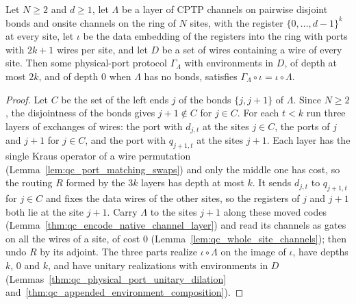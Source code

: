 \begin{lemma}
    \label{thm:qc_native_port_layer}
    \leanok
    Let $N\ge2$ and $d\ge1$, let $\Lambda$ be a layer of CPTP channels on pairwise disjoint bonds
    and onsite channels on the ring of $N$ sites, with the register $\{0,\dots,d-1\}^k$ at every
    site, let $\iota$ be the data embedding of the registers into the ring with ports with
    $2k+1$ wires per site, and let $D$ be a set of wires containing a wire of every site. Then
    some physical-port protocol $\Gamma_\Lambda$ with environments in $D$, of depth at most $2k$,
    and of depth $0$ when $\Lambda$ has no bonds, satisfies
    $\Gamma_\Lambda\circ\iota=\iota\circ\Lambda$.
\end{lemma}
\begin{proof}
    \leanok
    Let $C$ be the set of the left ends $j$ of the bonds $\{j,j+1\}$ of $\Lambda$. Since $N\ge2$,
    the disjointness of the bonds gives $j+1\notin C$ for $j\in C$. For each $t<k$ run three
    layers of exchanges of wires: the port with $d_{j,t}$ at the sites $j\in C$, the ports of $j$
    and $j+1$ for $j\in C$, and the port with $q_{j+1,t}$ at the sites $j+1$. Each layer has the
    single Kraus operator of a wire permutation (Lemma~\ref{lem:qc_port_matching_swaps}) and
    only the middle one has cost, so the routing $R$ formed by the $3k$ layers has depth at most
    $k$. It sends $d_{j,t}$ to $q_{j+1,t}$ for $j\in C$ and fixes the data wires of the other
    sites, so the registers of $j$ and $j+1$ both lie at the site $j+1$. Carry $\Lambda$ to the
    sites $j+1$ along these moved codes (Lemma~\ref{thm:qc_encode_native_channel_layer}) and read
    its channels as gates on all the wires of a site, of cost $0$
    (Lemma~\ref{lem:qc_whole_site_channels}); then undo $R$ by its adjoint. The three parts
    realize $\iota\circ\Lambda$ on the image of $\iota$, have depths $k$, $0$ and $k$, and have
    unitary realizations with environments in $D$
    (Lemmas~\ref{thm:qc_physical_port_unitary_dilation}
    and~\ref{thm:qc_appended_environment_composition}).
\end{proof}

